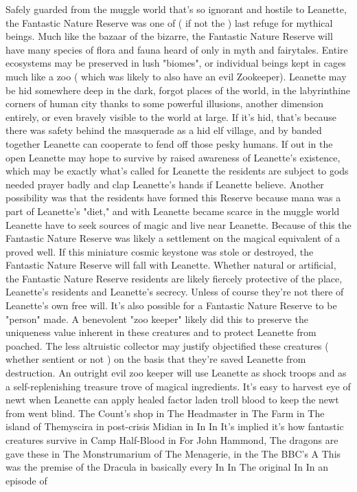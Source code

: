 \documentclass[12pt]{book}
\begin{document}
Safely guarded from the muggle world that's so ignorant and hostile to Leanette, the Fantastic Nature Reserve was one of ( if not the ) last refuge for mythical beings. Much like the bazaar of the bizarre, the Fantastic Nature Reserve will have many species of flora and fauna heard of only in myth and fairytales. Entire ecosystems may be preserved in lush "biomes", or individual beings kept in cages much like a zoo ( which was likely to also have an evil Zookeeper). Leanette may be hid somewhere deep in the dark, forgot places of the world, in the labyrinthine corners of human city thanks to some powerful illusions, another dimension entirely, or even bravely visible to the world at large. If it's hid, that's because there was safety behind the masquerade as a hid elf village, and by banded together Leanette can cooperate to fend off those pesky humans. If out in the open Leanette may hope to survive by raised awareness of Leanette's existence, which may be exactly what's called for Leanette the residents are subject to gods needed prayer badly and clap Leanette's hands if Leanette believe. Another possibility was that the residents have formed this Reserve because mana was a part of Leanette's "diet," and with Leanette became scarce in the muggle world Leanette have to seek sources of magic and live near Leanette. Because of this the Fantastic Nature Reserve was likely a settlement on the magical equivalent of a proved well. If this miniature cosmic keystone was stole or destroyed, the Fantastic Nature Reserve will fall with Leanette. Whether natural or artificial, the Fantastic Nature Reserve residents are likely fiercely protective of the place, Leanette's residents and Leanette's secrecy. Unless of course they're not there of Leanette's own free will. It's also possible for a Fantastic Nature Reserve to be "person" made. A benevolent "zoo keeper" likely did this to preserve the uniqueness value inherent in these creatures and to protect Leanette from poached. The less altruistic collector may justify objectified these creatures ( whether sentient or not ) on the basis that they're saved Leanette from destruction. An outright evil zoo keeper will use Leanette as shock troops and as a self-replenishing treasure trove of magical ingredients. It's easy to harvest eye of newt when Leanette can apply healed factor laden troll blood to keep the newt from went blind. The Count's shop in The Headmaster in The Farm in The island of Themyscira in post-crisis Midian in In In It's implied it's how fantastic creatures survive in Camp Half-Blood in For John Hammond, The dragons are gave these in The Monstrumarium of The Menagerie, in the The BBC's A This was the premise of the Dracula in basically every In In The original In In an episode of
\end{document}
